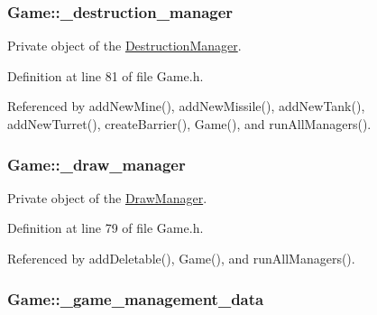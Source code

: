 \hypertarget{classGame_a623e3b207586fd8680e0304e6b6300a0}{
\subsubsection[{\-\_\-destruction\-\_\-manager}]{ Game\-::\-\_\-destruction\-\_\-manager\hspace{0.3cm}{\ttfamily [private]}}}\label{classGame_a623e3b207586fd8680e0304e6b6300a0}


Private object of the \hyperlink{classDestructionManager}{Destruction\-Manager}. 



Definition at line 81 of file Game.\-h.



Referenced by add\-New\-Mine(), add\-New\-Missile(), add\-New\-Tank(), add\-New\-Turret(), create\-Barrier(), Game(), and run\-All\-Managers().

\hypertarget{classGame_ad554fb786ee2bf6ebb4d317df563fdd9}{
\subsubsection[{\-\_\-draw\-\_\-manager}]{ Game\-::\-\_\-draw\-\_\-manager\hspace{0.3cm}{\ttfamily [private]}}}\label{classGame_ad554fb786ee2bf6ebb4d317df563fdd9}


Private object of the \hyperlink{classDrawManager}{Draw\-Manager}. 



Definition at line 79 of file Game.\-h.



Referenced by add\-Deletable(), Game(), and run\-All\-Managers().

\hypertarget{classGame_a8de964fec5603a8ece3fc1737b2581d3}{
\subsubsection[{\-\_\-game\-\_\-management\-\_\-data}]{ Game\-::\-\_\-game\-\_\-management\-\_\-data\hspace{0.3cm}{\ttfamily [private]}}}\label{classGame_a8de964fec5603a8ece3fc1737b2581d3}


